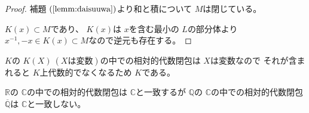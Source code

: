 \documentclass[../master_galois_theory]{subfiles}
\begin{document}
\begin{proof}
  補題 $(\mathrm{\ref{lemm:daisuuwa}})$より和と積について $M$は閉じている。

  $K(x) \subset M$であり、 $K(x)$は $x$を含む最小の $L$の部分体より $x^{-1} , -x \in K(x) \subset M$なので逆元も存在する。
\end{proof}

\begin{exam}
  $K$の $K(X) \  (Xは変数)$の中での相対的代数閉包は $X$は変数なので
  それが含まれると $K$上代数的でなくなるため $K$である。

  $\mathbb{R}$の $\mathbb{C}$の中での相対的代数閉包は $\mathbb{C}$と一致するが
  $\mathbb{Q}$の $\mathbb{C}$の中での相対的代数閉包 $\overline{\mathbb{Q}}$は
  $\mathbb{C}$と一致しない。
\end{exam}

\clearpage
\end{document}
